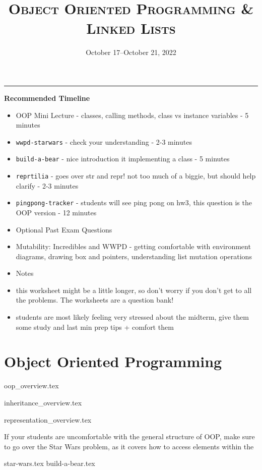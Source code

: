 \documentclass{exam}
\title{\textsc{Object Oriented Programming \titlebreak \& Linked Lists}}
\date{October 17--October 21, 2022}
\begin{document}
	\maketitle
	\rule{\textwidth}{0.15em}
	\fontsize{12}{15}\selectfont

\begin{meta}
	\textbf{Recommended Timeline}
	\begin{itemize}
		\item OOP Mini Lecture - classes, calling methods, class vs instance variables - 5 minutes
		\item \lstinline{wwpd-starwars} - check your understanding - 2-3 minutes
		\item \lstinline{build-a-bear} - nice introduction it implementing a class - 5 minutes
		\item \lstinline{reprtilia} - goes over str and repr! not too much of a biggie, but should help clarify - 2-3 minutes
		\item \lstinline{pingpong-tracker} - students will see ping pong on hw3, this question is the OOP version - 12 minutes
		\item Optional Past Exam Questions
		\item Mutability: Incredibles and WWPD - getting comfortable with environment diagrams, drawing box and pointers, understanding list mutation operations
		\item Notes
		\item this worksheet might be a little longer, so don't worry if you don't get to all the problems. The worksheets are a question bank!
		\item students are most likely feeling very stressed about the midterm, give them some study and last min prep tips + comfort them
	\end{itemize}
\end{meta}


\section{Object Oriented Programming}
{oop_overview.tex}

{inheritance_overview.tex}

{representation_overview.tex}
\begin{meta}
	If your students are uncomfortable with the general structure of OOP, make sure to go over the Star Wars problem, as it covers how to access elements within the  
\end{meta}
\newpage
\begin{questions}
{star-wars.tex}
\newpage
{build-a-bear.tex}
\end{questions}
\end{document}
